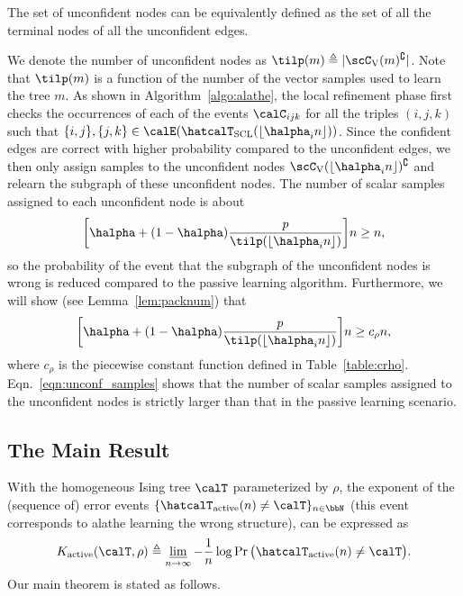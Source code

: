 \documentclass[11pt,onecolumn]{article}
\newcommand{\Active}{{\rm active}}
\begin{document}
\begin{remark}
    The set of unconfident nodes can be equivalently defined as the set of all the terminal nodes of all the unconfident edges.
\end{remark}
We denote the number of unconfident nodes as $\tilp(m)\triangleq |\scC_{\mathrm{V}}(m)^{\complement}|$. Note that $\tilp(m)$  is a function of the number of the vector samples used to learn the tree  $m$. As shown in Algorithm~\ref{algo:alathe}, the local refinement phase first checks the occurrences of each of the events $\calC_{ijk}$ for all the triples $(i,j,k)$ such that 
$\{i,j\}, \{j,k\}\in \calE(\hatcalT_{\rm{SCL}}(\lfloor\halpha_{i}n\rfloor))$. Since the confident edges are correct with higher probability compared to the unconfident edges, we then only assign samples to the unconfident nodes $\scC_{\mathrm{V}}(\lfloor\halpha_{i}n\rfloor)^{\complement}$ and relearn the 
subgraph of these unconfident nodes. The number of scalar samples assigned to each unconfident node is about
\begin{align}
\bigg[\halpha+(1-\halpha)\frac{p}{\tilp(\lfloor\halpha_{i}n\rfloor)}\bigg]n\geq n,    
\end{align}
 so the probability of the event that the 
subgraph of the unconfident nodes is wrong is reduced compared to the passive learning algorithm. Furthermore, we will show (see Lemma~\ref{lem:packnum}) that 
\begin{align}
\bigg[\halpha+(1-\halpha)\frac{p}{\tilp(\lfloor\halpha_{i}n\rfloor)}\bigg]n\geq c_{\rho}n,   \label{eqn:unconf_samples}  
\end{align}
 where $c_{\rho}$ is the  piecewise constant  function  defined in Table~\ref{table:crho}. Eqn.~\eqref{eqn:unconf_samples} shows that the number of scalar samples assigned to the unconfident nodes is strictly  larger than that in the passive learning scenario.

\subsection{The Main Result} \label{sec:main_res}
With the homogeneous Ising tree $\calT$ parameterized by $\rho$, the exponent of the (sequence of) error events $\{\hatcalT_{\Active}(n)\neq \calT\}_{n\in\bbN}$ (this event corresponds to  \ac{alathe}  learning the wrong structure), can be expressed as
\begin{align}\label{eq:activeee}
	K _{\Active}(\calT,\rho)\triangleq \varliminf_{n\rightarrow \infty}-\frac{1}{n}\log \Pr\big(\hatcalT_{\Active}(n)\neq \calT\big).
\end{align}
Our main theorem is stated as follows.
\end{document}
